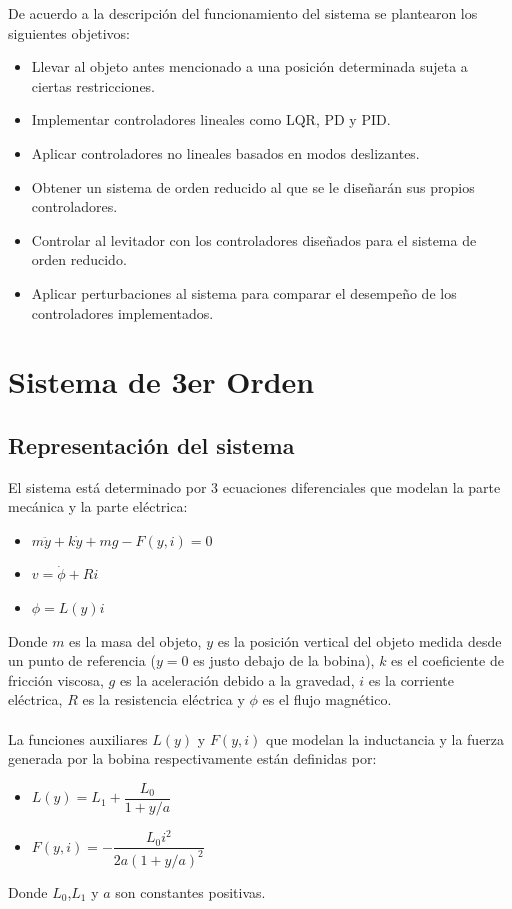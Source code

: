 \documentclass[onecolumn,10pt]{article}
\begin{document}
De acuerdo a la descripci\'on del funcionamiento del sistema se plantearon los siguientes objetivos:
\begin{itemize}
 \item Llevar al objeto antes mencionado a una posici\'on determinada sujeta a ciertas restricciones.
 \item Implementar controladores lineales como LQR, PD y PID.
 \item Aplicar controladores  no lineales basados en modos deslizantes.
 \item Obtener un sistema de orden reducido al que se le dise\~nar\'an sus propios controladores.
 \item Controlar al levitador con los controladores dise\~nados para el sistema de orden reducido.
 \item Aplicar perturbaciones al sistema para comparar el desempe\~no de los controladores implementados.
\end{itemize}
 

\section{Sistema de 3er Orden}
\subsection*{Representaci\'on del sistema}
El sistema est\'a determinado por 3 ecuaciones diferenciales que modelan la parte mec\'anica y la parte el\'ectrica:
\begin{itemize}
\item $m\ddot{y}+k\dot{y}+mg-F(y,i)=0$
\item $v=\dot{\phi}+Ri$
\item $\phi=L(y)i$
\end{itemize}



Donde $m$ es la masa del objeto, $y$ es la posici\'on vertical del objeto medida desde un punto de referencia ($y=0$ es justo debajo de la bobina), $k$ es el coeficiente de fricci\'on viscosa, $g$ es la aceleraci\'on debido a la gravedad, $i$ es la corriente el\'ectrica, $R$ es la resistencia el\'ectrica y $\phi$ es el flujo magn\'etico.
\\
\\
La funciones auxiliares $L(y)$ y $F(y,i)$  que modelan la inductancia y la fuerza  generada por la bobina respectivamente est\'an definidas por:
\begin{itemize}
\item $L(y)=L_1+\dfrac{L_0}{1+y/a}$
\item $F(y,i)=-\dfrac{L_0i^{2}}{2a(1+y/a)^{2}}$
\end{itemize}
Donde $L_0$,$L_1$ y $a$ son constantes positivas. 
\end{document}

